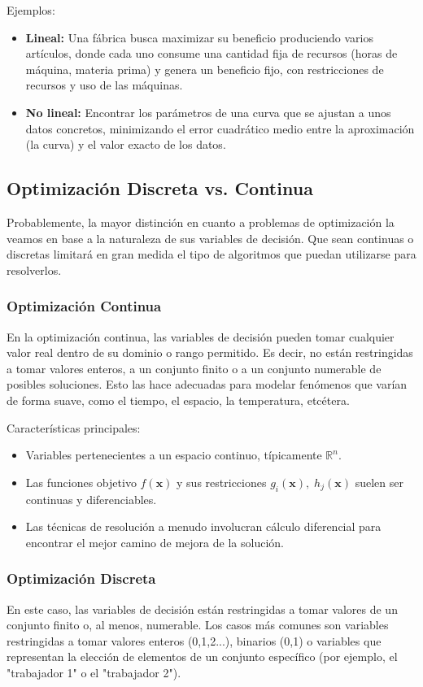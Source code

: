 \documentclass[12pt,a4paper]{book}
\begin{document}
Ejemplos:
\begin{itemize}
    \item \textbf{Lineal:} Una fábrica busca maximizar su beneficio produciendo varios artículos, donde cada uno consume una cantidad fija de recursos (horas de máquina, materia prima) y genera un beneficio fijo, con restricciones de recursos y uso de las máquinas.
    \item \textbf{No lineal:} Encontrar los parámetros de una curva que se ajustan a unos datos concretos, minimizando el error cuadrático medio entre la aproximación (la curva) y el valor exacto de los datos.
\end{itemize}

\subsection{Optimización Discreta vs. Continua}
Probablemente, la mayor distinción en cuanto a problemas de optimización la veamos en base a la naturaleza de sus variables de decisión. Que sean continuas o discretas
limitará en gran medida el tipo de algoritmos que puedan utilizarse para resolverlos.

\subsubsection{Optimización Continua}
En la optimización continua, las variables de decisión pueden tomar cualquier valor real dentro de su dominio o rango permitido. Es decir, no están restringidas a tomar valores enteros, a un conjunto finito o a un conjunto numerable de posibles soluciones. Esto las hace adecuadas para modelar fenómenos que varían de forma suave, como el tiempo, el espacio, la temperatura, etcétera.

Características principales:
\begin{itemize}
    \item Variables pertenecientes a un espacio continuo, típicamente $\mathbb{R}^n$.
    \item Las funciones objetivo $f(\mathbf{x})$ y sus restricciones $g_i(\mathbf{x}), \;h_j(\mathbf{x})$ suelen ser continuas y diferenciables.
    \item Las técnicas de resolución a menudo involucran cálculo diferencial para encontrar el mejor camino de mejora de la solución.
\end{itemize}

\subsubsection{Optimización Discreta}
En este caso, las variables de decisión están restringidas a tomar valores de un conjunto finito o, al menos, numerable. Los casos más comunes son variables restringidas a tomar valores enteros (0,1,2...), binarios (0,1) o variables que representan la elección de elementos de un conjunto específico (por ejemplo, el "trabajador 1" o el "trabajador 2").
\end{document}

